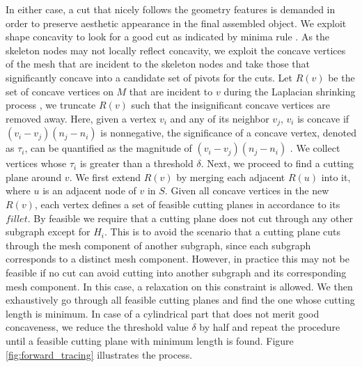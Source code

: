 In either case, a cut that nicely follows the geometry features is demanded in order to preserve aesthetic appearance in the final assembled object. We exploit shape concavity to look for a good cut as indicated by minima rule \cite{hoffman1984parts,hoffman1997salience}. As the skeleton nodes may not locally reflect concavity, we exploit the concave vertices of the mesh that are incident to the skeleton nodes and take those that significantly concave into a candidate set of pivots for the cuts. Let $R(v)$ be the set of concave vertices on $M$ that are incident to $v$ during the Laplacian shrinking process \cite{AuTCCL08}, we truncate $R(v)$ such that the insignificant concave vertices are removed away. Here, given a vertex $v_i$ and any of its neighbor $v_j$, $v_i$ is concave if $(v_i - v_j)(n_j - n_i)$ is nonnegative, the significance of a concave vertex, denoted as $\tau_i$, can be quantified as the magnitude of $(v_i - v_j)(n_j - n_i)$ \cite{au2012mesh}. We collect vertices whose $\tau_i$ is greater than a threshold $\delta$.
Next, we proceed to find a cutting plane around $v$. We first extend $R(v)$ by merging each adjacent $R(u)$ into it, where $u$ is an adjacent node of $v$ in $S$. Given all concave vertices in the new $R(v)$, each vertex defines a set of feasible cutting planes in accordance to its $fillet$. By feasible we require that a cutting plane does not cut through any other subgraph except for $H_i$. {\color{blue} This is to avoid the scenario that a cutting plane cuts through the mesh component of another subgraph, since each subgraph corresponds to a distinct mesh component. However, in practice this may not be feasible if no cut can avoid cutting into another subgraph and its corresponding mesh component. In this case, a relaxation on this constraint is allowed.} We then exhaustively go through all feasible cutting planes and find the one whose cutting length is minimum. In case of a cylindrical part that does not merit good concaveness, we reduce the threshold value $\delta$ by half and repeat the procedure until a feasible cutting plane with minimum length is found. Figure \ref{fig:forward_tracing} illustrates the process.

